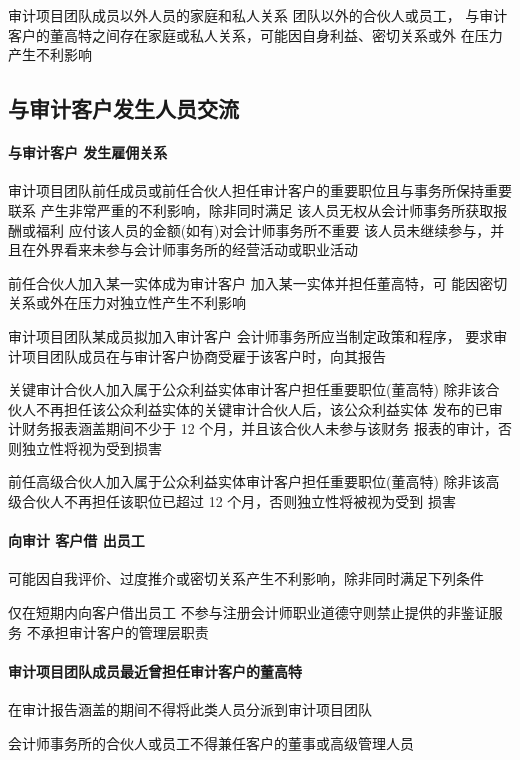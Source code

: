 \documentclass[UTF8,12pt]{ctexart}
\numberwithin{equation}{section} %
\numberwithin{figure}{section}
\numberwithin{table}{section}
\begin{document}
	审计项目团队成员以外人员的家庭和私人关系    团队以外的合伙人或员工， 与审计客户的董高特之间存在家庭或私人关系，可能因自身利益、密切关系或外 在压力产生不利影响
	
	\subsection{与审计客户发生人员交流}
	
	\paragraph{与审计客户 发生雇佣关系}
	审计项目团队前任成员或前任合伙人担任审计客户的重要职位且与事务所保持重要联系    产生非常严重的不利影响，除非同时满足 该人员无权从会计师事务所获取报酬或福利 应付该人员的金额(如有)对会计师事务所不重要 该人员未继续参与，并且在外界看来未参与会计师事务所的经营活动或职业活动
	
	前任合伙人加入某一实体成为审计客户    加入某一实体并担任董高特，可 能因密切关系或外在压力对独立性产生不利影响 
	
	审计项目团队某成员拟加入审计客户    会计师事务所应当制定政策和程序， 要求审计项目团队成员在与审计客户协商受雇于该客户时，向其报告 
	
	关键审计合伙人加入属于公众利益实体审计客户担任重要职位(董高特)
	除非该合伙人不再担任该公众利益实体的关键审计合伙人后，该公众利益实体 发布的已审计财务报表涵盖期间不少于 12 个月，并且该合伙人未参与该财务 报表的审计，否则独立性将视为受到损害
	
	前任高级合伙人加入属于公众利益实体审计客户担任重要职位(董高特) 除非该高级合伙人不再担任该职位已超过 12 个月，否则独立性将被视为受到 损害
	
	\paragraph{向审计 客户借 出员工}
	可能因自我评价、过度推介或密切关系产生不利影响，除非同时满足下列条件

	仅在短期内向客户借出员工
	不参与注册会计师职业道德守则禁止提供的非鉴证服务
	不承担审计客户的管理层职责
	
	\paragraph{审计项目团队成员最近曾担任审计客户的董高特}
	在审计报告涵盖的期间不得将此类人员分派到审计项目团队
	
	会计师事务所的合伙人或员工不得兼任客户的董事或高级管理人员
	
\end{document}
